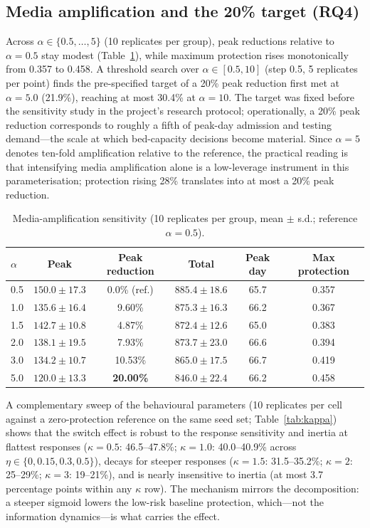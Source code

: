 \documentclass[]{interact}
\begin{document}
\subsection{Media amplification and the 20\% target (RQ4)}
\label{sec:media}

Across $\alpha \in \{0.5,\dots,5\}$ (10 replicates per group), peak reductions relative to $\alpha{=}0.5$ stay modest (Table~\ref{tab:alpha}), while maximum protection rises monotonically from 0.357 to 0.458. A threshold search over $\alpha \in [0.5, 10]$ (step 0.5, 5 replicates per point) finds the pre-specified target of a 20\% peak reduction first met at $\alpha{=}5.0$ (21.9\%), reaching at most 30.4\% at $\alpha{=}10$. The target was fixed before the sensitivity study in the project's research protocol; operationally, a 20\% peak reduction corresponds to roughly a fifth of peak-day admission and testing demand---the scale at which bed-capacity decisions become material. Since $\alpha{=}5$ denotes ten-fold amplification relative to the reference, the practical reading is that intensifying media amplification alone is a low-leverage instrument in this parameterisation; protection rising 28\% translates into at most a 20\% peak reduction.

\begin{table}[htb]
\centering
\small
\begin{tabular}{lccccc}
\hline
$\alpha$ & \textbf{Peak} & \textbf{Peak reduction} & \textbf{Total} & \textbf{Peak day} & \textbf{Max protection} \\
\hline
0.5 & $150.0 \pm 17.3$ & 0.0\% (ref.) & $885.4 \pm 18.6$ & 65.7 & 0.357 \\
1.0 & $135.6 \pm 16.4$ & 9.60\% & $875.3 \pm 16.3$ & 66.2 & 0.367 \\
1.5 & $142.7 \pm 10.8$ & 4.87\% & $872.4 \pm 12.6$ & 65.0 & 0.383 \\
2.0 & $138.1 \pm 19.5$ & 7.93\% & $873.7 \pm 23.0$ & 66.6 & 0.394 \\
3.0 & $134.2 \pm 10.7$ & 10.53\% & $865.0 \pm 17.5$ & 66.7 & 0.419 \\
5.0 & $120.0 \pm 13.3$ & \textbf{20.00\%} & $846.0 \pm 22.4$ & 66.2 & 0.458 \\
\hline
\end{tabular}
\caption{Media-amplification sensitivity (10 replicates per group, mean $\pm$ s.d.; reference $\alpha{=}0.5$).}
\label{tab:alpha}
\end{table}

A complementary sweep of the behavioural parameters (10 replicates per cell against a zero-protection reference on the same seed set; Table~\ref{tab:kappa}) shows that the switch effect is robust to the response sensitivity and inertia at flattest responses ($\kappa{=}0.5$: 46.5--47.8\%; $\kappa{=}1.0$: 40.0--40.9\% across $\eta \in \{0, 0.15, 0.3, 0.5\}$), decays for steeper responses ($\kappa{=}1.5$: 31.5--35.2\%; $\kappa{=}2$: 25--29\%; $\kappa{=}3$: 19--21\%), and is nearly insensitive to inertia (at most 3.7 percentage points within any $\kappa$ row). The mechanism mirrors the decomposition: a steeper sigmoid lowers the low-risk baseline protection, which---not the information dynamics---is what carries the effect.
\end{document}
